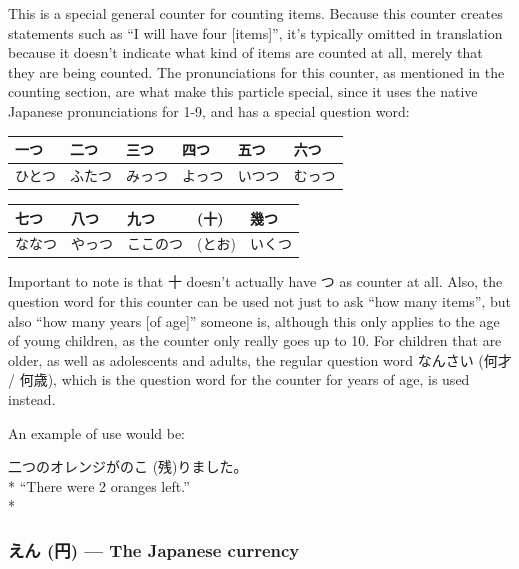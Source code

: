 \documentclass[11pt, b5paper, twoside, openright, onecolumn]{book}
\makeatletter
\newcommand*{\rubystack}[2]{{\relscale{0.5}%
  \begin{tabular}[b]{@{}c@{}}%
    {#1}\\%
   {\textscale{2}{#2}}%
  \end{tabular}}%
}
\DeclareRobustCommand*{\ruby}[2]{%
  \mbox{%
    \setlength{\parskip}{0ex}%
    \BeginAccSupp{method=pdfstringdef,ActualText={#1}}%
      \rubystack{\phantom{#2}}{#1}%
      \llap{%
        \rubystack{#2}{\phantom{#1}}%
      }%
    \EndAccSupp{}%
  }%
}
\renewcommand*{\ruby}[2]{#2 (#1)}%
\newenvironment{exampleblock}{
\setlength{\parindent}{0.6in}
\begin{minipage}[t]{\dimexpr\textwidth-\parindent}}
{\end{minipage}}
\newenvironment{mytabular}[1]{\noindent\hspace{0.4in}
\begin{tabular}[h]{#1}}{\end{tabular}}
\makeatother
\begin{document}
This is a special general counter for counting items. Because this counter creates statements such as “I will have four [items]”‚ it’s typically omitted in translation because it doesn’t indicate what kind of items are counted at all‚ merely that they are being counted. The pronunciations for this counter‚ as mentioned in the counting section‚ are what make this particle special‚ since it uses the native Japanese pronunciations for 1-9‚ and has a special question word:

\vspace{0.5cm}
\smaller
\begin{mytabular}{| l  l  l  l  l  l |}\hline 
\rule{0pt}{2.4ex}一つ & 二つ & 三つ & 四つ & 五つ & 六つ\\ 
\hline
\rule{0pt}{2.4ex}ひとつ & ふたつ & みっつ & よっつ & いつつ & むっつ\\ 
\hline 
\end{mytabular}
\larger
\vspace{0.5cm}

\smaller
\begin{mytabular}{| l  l  l  l  l |}\hline 
\rule{0pt}{2.4ex}七つ & 八つ & 九つ & (十) & \index[japanese]{いくつ (幾つ)}幾つ\\ 
\hline
\rule{0pt}{2.4ex}ななつ & やっつ & ここのつ & (とお) & いくつ\\ 
\hline 
\end{mytabular}
\larger
\vspace{0.5cm}


Important to note is that 十 doesn’t actually have つ as counter at all. Also‚ the question word for this counter can be used not just to ask “how many items”‚ but also “how many years [of age]” someone is‚ although this only applies to the age of young children‚ as the counter only really goes up to 10. For children that are older‚ as well as adolescents and adults‚ the regular question word なんさい (何才 / 何歳)‚ which is the question word for the counter for years of age‚ is used instead.

An example of use would be:

\vspace{0.4cm}
\begin{exampleblock}
二つのオレンジが\ruby{残}{のこ}りました。 \\* 
“There were 2 oranges left.” \\* 
\end{exampleblock}
\subsubsection{\ruby{円}{えん} — The Japanese currency}
\end{document}
